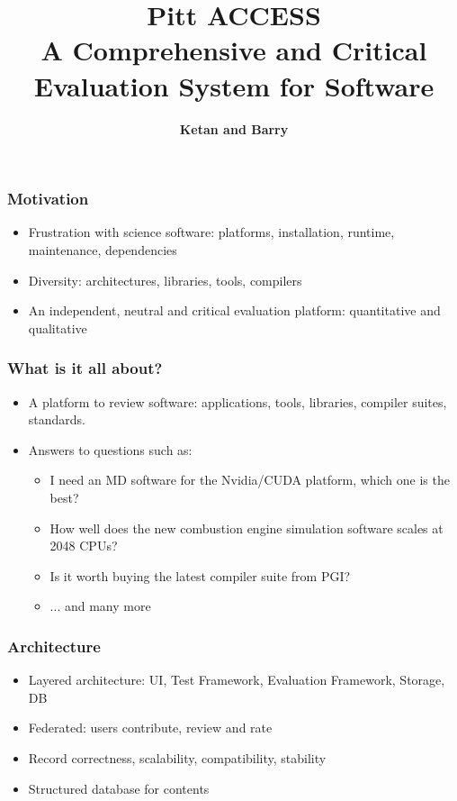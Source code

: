 \documentclass[hyperref={pdfpagelabels=false},12pt]{beamer}
\title[Pitt Access]{{\large Pitt ACCESS\\ A Comprehensive and Critical Evaluation System for Software}}
\author[Pitt-Access]{{\scriptsize \textbf{Ketan and Barry}}}
\date{}
\begin{document}
\begin{frame}[plain]
\titlepage
\end{frame}

\begin{frame}
\frametitle{Motivation}
\begin{itemize}
\itemsep1em
\item 
Frustration with science software: platforms, installation, runtime, maintenance, dependencies
\item 
Diversity: architectures, libraries, tools, compilers
\item 
An independent, neutral and critical evaluation platform: quantitative and qualitative
\end{itemize}
\end{frame}

\begin{frame}
\frametitle{What is it all about?}
\begin{itemize}
\itemsep1em
\item 
A platform to review software: applications, tools, libraries, compiler suites, standards.
\item 
Answers to questions such as:
\begin{itemize}
\item 
I need an MD software for the Nvidia/CUDA platform, which one is the best?
\item 
How well does the new combustion engine simulation software scales at 2048 CPUs?
\item 
Is it worth buying the latest compiler suite from PGI?
\item 
... and many more
\end{itemize}
\end{itemize}

\end{frame}

\begin{frame}
\frametitle{Architecture}
\begin{itemize}
\itemsep1em
\item 
Layered architecture: UI, Test Framework, Evaluation Framework, Storage, DB
\item
Federated: users contribute, review and rate
\item
Record correctness, scalability, compatibility, stability
\item
Structured database for contents
\end{itemize}
\end{frame}
\end{document}
